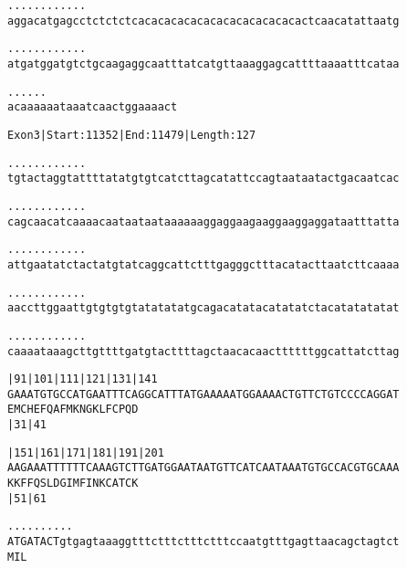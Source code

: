 \documentclass{article}
\begin{document}
\newpage
\begin{alltt}
.    .    .    .    .    .    .    .    .    .    .    .
aggacatgagcctctctctcacacacacacacacacacacacacactcaacatattaatg



.    .    .    .    .    .    .    .    .    .    .    .
atgatggatgtctgcaagaggcaatttatcatgttaaaggagcattttaaaatttcataa



.    .    .    .    .    .
acaaaaaataaatcaactggaaaact


\end{alltt}
\newpage
\begin{alltt}
Exon 3 | Start: 11352 | End: 11479 | Length: 127

.    .    .    .    .    .    .    .    .    .    .    .
tgtactaggtattttatatgtgtcatcttagcatattccagtaataatactgacaatcac



.    .    .    .    .    .    .    .    .    .    .    .
cagcaacatcaaaacaataataataaaaaaggaggaagaaggaaggaggataatttatta



.    .    .    .    .    .    .    .    .    .    .    .
attgaatatctactatgtatcaggcattctttgagggctttacatacttaatcttcaaaa



.    .    .    .    .    .    .    .    .    .    .    .
aaccttggaattgtgtgtgtatatatatgcagacatatacatatatctacatatatatat



.    .    .    .    .    .    .    .    .    .    .    .
caaaataaagcttgttttgatgtacttttagctaacacaacttttttggcattatcttag



         |91       |101      |111      |121      |131      |141
GAAATGTGCCATGAATTTCAGGCATTTATGAAAAATGGAAAACTGTTCTGTCCCCAGGAT
E  M  C  H  E  F  Q  A  F  M  K  N  G  K  L  F  C  P  Q  D
         |31                           |41

         |151      |161      |171      |181      |191      |201
AAGAAATTTTTTCAAAGTCTTGATGGAATAATGTTCATCAATAAATGTGCCACGTGCAAA
K  K  F  F  Q  S  L  D  G  I  M  F  I  N  K  C  A  T  C  K
         |51                           |61

            .    .    .    .    .    .    .    .    .    .
ATGATACTgtgagtaaaggtttctttctttctttccaatgtttgagttaacagctagtct
M  I  L


\end{alltt}
\newpage
\end{document}
